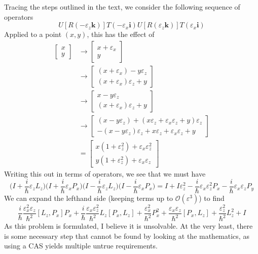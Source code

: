 \documentclass[../principles-of-quantum-mechanics.tex]{subfiles}
\begin{document}
\begin{questions}
	\begin{solution}
		\color{red}
		Tracing the steps outlined in the text, we consider the following sequence of operators
		$$U[R(-\varepsilon_z\mathbf{k})]T(-\varepsilon_x\mathbf{i})U[R(\varepsilon_z\mathbf{k})]T(\varepsilon_x\mathbf{i})$$
		Applied to a point $(x, y)$, this has the effect of
		\begin{align*}
			\begin{bmatrix}x \\ y\end{bmatrix} &\to \begin{bmatrix}x + \varepsilon_x \\ y\end{bmatrix} \\
			&\to \begin{bmatrix}(x + \varepsilon_x) - y\varepsilon_z \\ (x + \varepsilon_x)\varepsilon_z + y\end{bmatrix} \\
			&\to \begin{bmatrix}x - y\varepsilon_z \\ (x + \varepsilon_x)\varepsilon_z + y\end{bmatrix} \\
			&\to \begin{bmatrix}(x - y\varepsilon_z) + (x\varepsilon_z + \varepsilon_x\varepsilon_z + y)\varepsilon_z \\
			-(x - y\varepsilon_z)\varepsilon_z + x\varepsilon_z + \varepsilon_x\varepsilon_z + y\end{bmatrix} \\
			&= \begin{bmatrix}
				x(1 + \varepsilon_z^2) + \varepsilon_x\varepsilon_z^2 \\ y(1 + \varepsilon_z^2) + \varepsilon_x\varepsilon_z
			\end{bmatrix}
		\end{align*}
		Writing this out in terms of operators, we see that we must have
		$$\Big(I + \frac{i}{\hbar}\varepsilon_zL_z\Big)\Big(I + \frac{i}{\hbar}\varepsilon_xP_x\Big)\Big(I - \frac{i}{\hbar}\varepsilon_zL_z\Big)\Big(I - \frac{i}{\hbar}\varepsilon_xP_x\Big) = I + I\varepsilon_z^2 - \frac{i}{\hbar}\varepsilon_x\varepsilon_z^2P_x - \frac{i}{\hbar}\varepsilon_x\varepsilon_z P_y$$
		We can expand the lefthand side (keeping terms up to $\mathcal{O}(\varepsilon^3)$) to find
		$$\frac{i}{\hbar}\frac{\varepsilon_x^2\varepsilon_z}{\hbar^2}[L_z, P_x]P_x + \frac{i}{\hbar}\frac{\varepsilon_x\varepsilon_z^2}{\hbar^2}L_z[P_x, L_z] + \frac{\varepsilon_x^2}{\hbar^2}P_x^2 + \frac{\varepsilon_x\varepsilon_z}{\hbar^2}[P_x, L_z] + \frac{\varepsilon_z^2}{\hbar^2}L_z^2 + I$$
		\color{black}
		As this problem is formulated, I believe it is unsolvable. At the very least, there is some necessary step that cannot be found by looking at the mathematics, as using a CAS yields multiple untrue requirements.
	\end{solution}
	

\end{questions}
\end{document}
